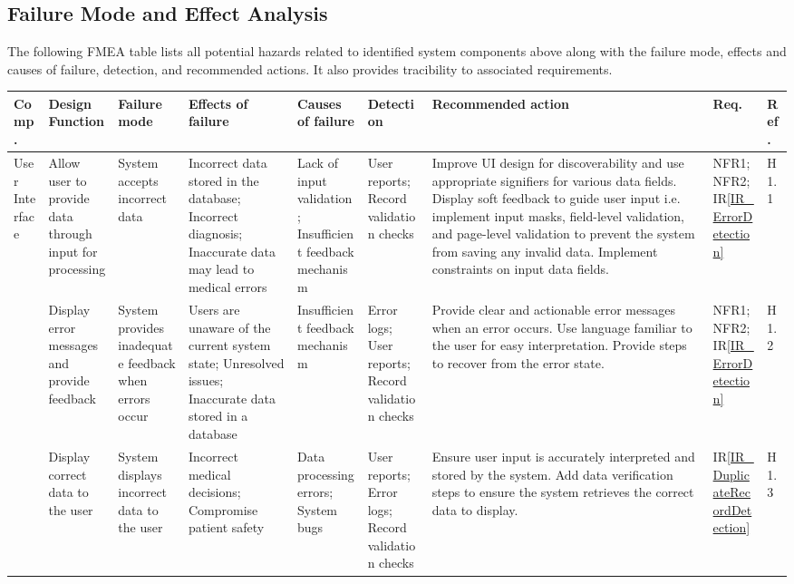 \documentclass{article}
\begin{document}
\begin{landscape} 

\section{Failure Mode and Effect Analysis}

The following FMEA table lists all potential hazards related to identified system components above along with the failure mode, effects and causes of failure, detection, and recommended actions. It also provides tracibility to associated requirements.\\
    
    \begin{longtable}{|p{1.5cm}|p{2cm}|p{2.6cm}|p{2cm}|p{2cm}|p{2cm}|p{3.5cm}|p{1cm}|p{0.8cm}|}
        \toprule
        \textbf{Comp.} & \textbf{Design Function} & \textbf{Failure mode} & \textbf{Effects of failure} & \textbf{Causes of failure} & \textbf{Detection} & \textbf{Recommended action} & \textbf{Req.} & \textbf{Ref.}\\ 
        \midrule
        User Interface & \raggedright Allow user to provide data through input for processing & \raggedright System accepts incorrect data & \raggedright Incorrect data stored in the database; Incorrect diagnosis; Inaccurate data may lead to medical errors & \raggedright Lack of input validation; Insufficient feedback mechanism & \raggedright User reports; Record validation checks & \raggedright Improve UI design for discoverability and use appropriate signifiers for various data fields. Display soft feedback to guide user input i.e. implement input masks, field-level validation, and page-level validation to prevent the system from saving any invalid data. Implement constraints on input data fields. & NFR1; NFR2; IR\ref{IR_ErrorDetection} & H1.1 \\ 
        \midrule
        & \raggedright Display error messages and provide feedback & \raggedright System provides inadequate feedback when errors occur & \raggedright Users are unaware of the current system state; Unresolved issues; Inaccurate data stored in a database & \raggedright Insufficient feedback mechanism & \raggedright Error logs; User reports; Record validation checks & \raggedright Provide clear and actionable error messages when an error occurs. Use language familiar to the user for easy interpretation. Provide steps to recover from the error state. & NFR1; NFR2; IR\ref{IR_ErrorDetection} & H1.2 \\
        \midrule
        & \raggedright Display correct data to the user & \raggedright System displays incorrect data to the user & \raggedright Incorrect medical decisions; Compromise patient safety & \raggedright Data processing errors; System bugs & \raggedright User reports; Error logs; Record validation checks & \raggedright Ensure user input is accurately interpreted and stored by the system. Add data verification steps to ensure the system retrieves the correct data to display. & IR\ref{IR_DuplicateRecordDetection} & H1.3 \\

\end{longtable}
\end{landscape}
\end{document}
